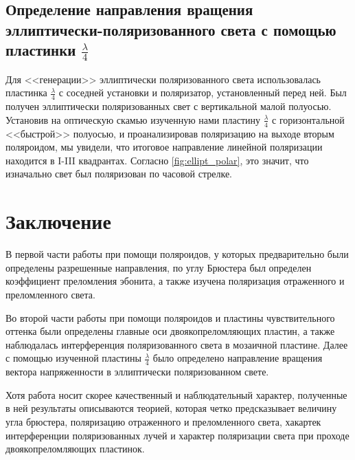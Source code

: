 \documentclass[a4paper,12pt]{article} %
\begin{document}
\subsection{Определение направления вращения эллиптически-поляризованного света с помощью пластинки $\frac{\lambda}{4}$}

Для <<генерации>> эллиптически поляризованного света использовалась пластинка $\frac{\lambda}{4}$ с соседней установки и поляризатор, установленный перед ней. Был получен эллиптически поляризованных свет с вертикальной малой полуосью. Установив на оптическую скамью изученную нами пластину $\frac{\lambda}{4}$ с горизонтальной <<быстрой>> полуосью, и проанализировав поляризацию на выходе вторым поляроидом, мы увидели, что итоговое направление линейной поляризации находится в I-III квадрантах. Согласно \ref{fig:ellipt_polar}, это значит, что изначально свет был поляризован по часовой стрелке.

\section{Заключение}

В первой части работы при помощи поляроидов, у которых предварительно были определены разрешенные направления, по углу Брюстера был определен коэффициент преломления эбонита, а также изучена поляризация отраженного и преломленного света.

Во второй части работы при помощи поляроидов и пластины чувствительного оттенка были определены главные оси двоякопреломляющих пластин, а также наблюдалась интерференция поляризованного света в мозаичной пластине. Далее с помощью изученной пластины $\frac{\lambda}{4}$ было определено направление вращения вектора напряженности в эллиптически поляризованном свете. 

Хотя работа носит скорее качественный и наблюдательный характер, полученные в ней результаты описываются теорией, которая четко предсказывает величину угла брюстера, поляризацию отраженного и преломленного света, хакартек интерференции поляризованных лучей и характер поляризации света при проходе двоякопреломляющих пластинок. 
\end{document}
